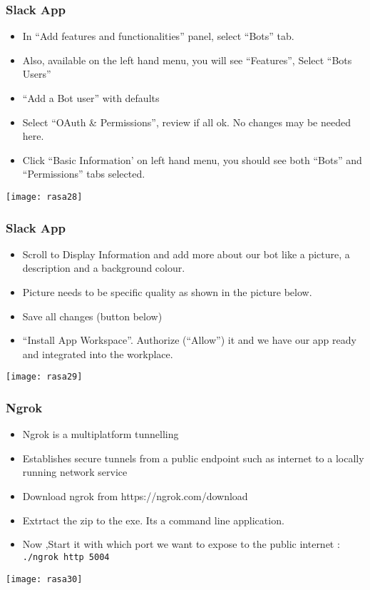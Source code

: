 \begin{frame}[fragile]\frametitle{Slack App}
\begin{itemize}
\item In ``Add features and functionalities'' panel, select ``Bots'' tab.
\item Also, available on the left hand menu, you will see ``Features'', Select ``Bots Users''
\item ``Add a Bot user'' with defaults
\item Select ``OAuth \& Permissions'', review if all ok. No changes may be needed here.
\item Click ``Basic Information' on left hand menu, you should see both ``Bots'' and ``Permissions'' tabs selected.
\end{itemize}

\begin{center}
\texttt{[image: rasa28]}
\end{center}
\end{frame}

\begin{frame}[fragile]\frametitle{Slack App}
\begin{itemize}
\item Scroll to Display Information and add more about our bot like a picture, a description and a background colour.
\item Picture needs to be specific quality as shown in the picture below.
\item Save all changes (button below)
\item ``Install App Workspace''. Authorize (``Allow'') it and we have our app ready and integrated into the workplace.
\end{itemize}

\begin{center}
\texttt{[image: rasa29]}
\end{center}
\end{frame}

\begin{frame}[fragile]\frametitle{Ngrok}
\begin{itemize}
\item Ngrok is a multiplatform tunnelling
\item Establishes secure tunnels from a public endpoint such as internet to a locally running network service
\item Download ngrok from https://ngrok.com/download 	
\item Extrtact the zip to the exe. Its a command line application.
\item Now ,Start it with which port we want to expose to the public internet : \lstinline| ./ngrok http 5004|
\end{itemize}

\begin{center}
\texttt{[image: rasa30]}
\end{center}
\end{frame}

